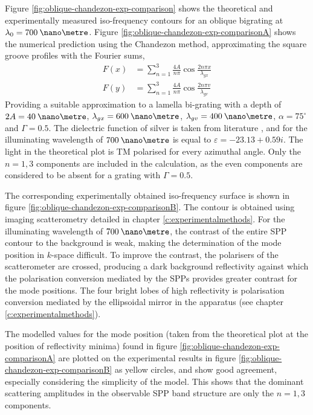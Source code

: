 Figure \ref{fig:oblique-chandezon-exp-comparison} shows the theoretical and experimentally measured iso-frequency contours for an oblique bigrating at $\lambda_0=700\:\nano\metre$.  Figure \ref{fig:oblique-chandezon-exp-comparisonA} shows the numerical prediction using the Chandezon method, approximating the square groove profiles with the Fourier sums,
\begin{align}
F(x) &= \sum\limits_{n=1}^3  \frac{4A}{n \pi}\cos{\frac{2 n \pi x}{\lambda_{gx}}}\\
F(y) &= \sum\limits_{n=1}^3  \frac{4A}{n \pi}\cos{\frac{2 n \pi v}{\lambda_{gv}}}
\end{align}
Providing a suitable approximation to a lamella bi-grating with a depth of $2A=40\:\nano\metre$, $\lambda_{gx}=600\:\nano\metre$, $\lambda_{gv}=400\:\nano\metre$, $\alpha=75^\circ$ and $\Gamma=0.5$. The dielectric function of silver is taken from literature \cite{Nash1996}, and for the illuminating wavelength of $700\:\nano\metre$ is equal to $\varepsilon=-23.13+0.59i$. The light in the theoretical plot is TM polarised for every azimuthal angle. Only the $n=1,3$ components are included in the calculation, as the even components are considered to be absent for a grating with $\Gamma=0.5$.

The corresponding experimentally obtained iso-frequency surface is shown in figure \ref{fig:oblique-chandezon-exp-comparisonB}. The contour is obtained using imaging scatterometry detailed in chapter \ref{c:experimentalmethods}.  For the illuminating wavelength of $700\:\nano\metre$, the contrast of the entire SPP contour to the background is weak, making the determination of the mode position in $k$-space difficult. To improve the contrast, the polarisers of the scatterometer are crossed, producing a dark background reflectivity against which the polarisation conversion mediated by the SPPs \cite{Bryan-Brown1990} provides greater contrast for the mode positions. The four bright lobes of high reflectivity is polarisation conversion mediated by the ellipsoidal mirror in the apparatus (see chapter \ref{c:experimentalmethods}).  

The modelled values for the mode position (taken from the theoretical plot at the position of reflectivity minima) found in figure \ref{fig:oblique-chandezon-exp-comparisonA} are plotted on the experimental results in figure \ref{fig:oblique-chandezon-exp-comparisonB} as yellow circles, and show good agreement, especially considering the simplicity of the model. This shows that the dominant scattering amplitudes in the observable SPP band structure are only the $n=1,3$ components. 

